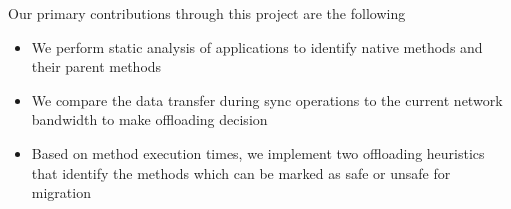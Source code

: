 Our primary contributions through this project are the following
\newline
\begin{itemize}
   \item We perform static analysis of applications to identify native methods and their parent methods
   \item We compare the data transfer during sync operations to the current network bandwidth to make offloading decision
   \item Based on method execution times, we implement two offloading heuristics that identify the methods which can be marked
   as safe or unsafe for migration
\end{itemize}

